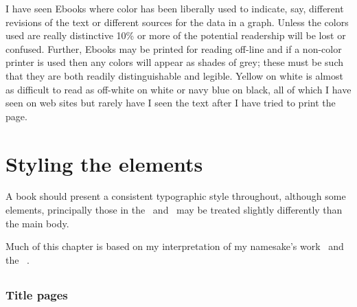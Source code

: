 \documentclass[10pt,a4paper,oneside,extrafontsizes]{memoir}%
\begin{document}
\begin{paracol}{2}
    I have seen Ebooks where color has been liberally used to indicate, say, 
different revisions of the text or different sources for the data in a graph. 
Unless the colors used are really distinctive 10\% or more of the potential 
readership will be lost or confused. Further,
Ebooks may be printed for reading off-line and if a non-color printer is
used then any colors will appear as shades of grey; these must be such that
they are both readily distinguishable and legible. Yellow on white is almost
as difficult to read as off-white on white or navy blue on black, all of
which I have seen on web sites but rarely have I seen the text after I 
have tried to print the page.
\end{paracol}



\chapter{Styling the elements}

\begin{paracol}{2}
\switchEng
    A book should present a consistent typographic style throughout, although
some elements, principally those in the \pixfrontmatter\ and \pixbackmatter\ 
may be treated slightly differently than the main body. 

    Much of this chapter is based on my interpretation of my namesake's 
work~\autocite{ADRIANWILSON93} and the \btitle{Chicago Manual of Style}~\autocite{CMS}.
\end{paracol}

\section{\prFrontmatter}

\subsection{Title pages}
\end{document}
